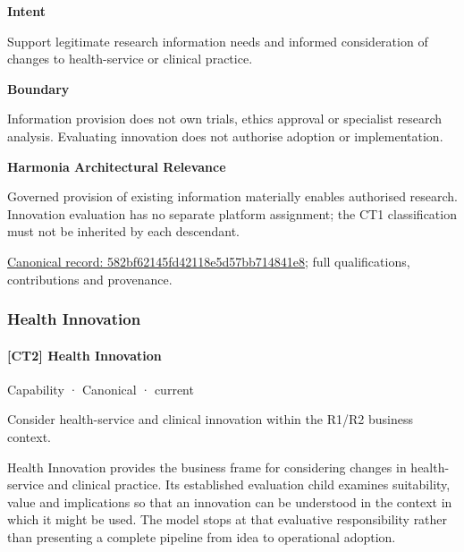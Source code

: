 \textbf{Intent}



Support legitimate research information needs and informed consideration of changes to health-service or clinical practice.



\textbf{Boundary}



Information provision does not own trials, ethics approval or specialist research analysis. Evaluating innovation does not authorise adoption or implementation.



\textbf{Harmonia Architectural Relevance}



Governed provision of existing information materially enables authorised research. Innovation evaluation has no separate platform assignment; the CT1 classification must not be inherited by each descendant.


{\footnotesize \href{../../../../continuum/strategy/capability/582bf62145fd42118e5d57bb714841e8.md}{Canonical record: 582bf62145fd42118e5d57bb714841e8}; full qualifications, contributions and provenance.}\par
\subsubsection{Health Innovation}

\paragraph{[CT2] Health Innovation}

\label{element:f263989e25c9469cac1bbad6491432f0}
{\small Capability · Canonical · current}\par

Consider health-service and clinical innovation within the R1/R2 business context.



Health Innovation provides the business frame for considering changes in health-service and clinical practice. Its established evaluation child examines suitability, value and implications so that an innovation can be understood in the context in which it might be used. The model stops at that evaluative responsibility rather than presenting a complete pipeline from idea to operational adoption.



